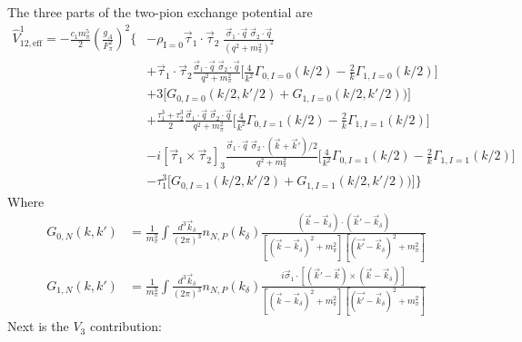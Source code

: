 \documentclass[%
 preprint,
 amsmath,amssymb,
 aps,
]{revtex4-1}
\newcommand{\veff}{\hat{V}_{12,\text{eff}}}
\newcommand{\rhozero}{\rho_{\text{I}=0}}
\newcommand{\taudot}{\vec{\tau}_1\cdot\vec{\tau}_2}
\newcommand{\taucrossthree}{\left[\vec{\tau}_1\times\vec{\tau}_2\right]_3}
\newcommand{\tauplusthree}{\frac{\tau_1^3+\tau_2^3}{2}}
\newcommand{\Gam}[3]{\Gamma_{#1, I=#2}\left(#3\right)}
\begin{document}
The three parts of the two-pion exchange potential are 
\begin{equation}\begin{split}
 \veff^1 = - \frac{c_1 m_\pi^5}{2} \left(\frac{g_A}{F_\pi^2}\right)^2
 \Bigg\{& -\rhozero \taudot \; \frac{\vec{\sigma}_1\cdot\vec{q}\;\vec{\sigma}_2\cdot\vec{q}}{(q^2+m_\pi^2)^2} \\
 &+ \taudot \frac{\vec{\sigma}_1 \cdot \vec{q}\; \vec{\sigma}_2\cdot \vec{q}}{q^2+m_\pi^2}\Big[\frac{4}{k^2}\Gam{0}{0}{k/2}-\frac{2}{k}\Gam{1}{0}{k/2}\Big] \\
 & +3 \Big[ G_{0,I=0}(k/2,k'/2)+G_{1,I=0}(k/2,k'/2)) \Big] \\
 &+\tauplusthree \frac{\vec{\sigma}_1 \cdot \vec{q}\; \vec{\sigma}_2\cdot \vec{q}}{q^2+m_\pi^2}\Big[\frac{4}{k^2}\Gam{0}{1}{k/2}-\frac{2}{k}\Gam{1}{1}{k/2}\Big] \\
 &- i \taucrossthree  \frac{\vec{\sigma}_1 \cdot \vec{q}\; \vec{\sigma}_2\cdot (\vec{k}+\vec{k}')/2}{q^2+m_\pi^2}\Big[\frac{4}{k^2}\Gam{0}{1}{k/2}-\frac{2}{k}\Gam{1}{1}{k/2}\Big]  \\
 & -\tau_1^3 \Big[ G_{0,I=1}(k/2,k'/2)+G_{1,I=1}(k/2,k'/2)) \Big] \Bigg\}
 \end{split}
 \end{equation}
Where
\begin{align}
G_{0,N}(k,k') & = \frac{1}{m_\pi^3}\int\frac{d^3\vec{k}_\delta}{(2\pi)^3} n_{N,P}(k_\delta) \frac{(\vec{k}-\vec{k}_\delta)\cdot(\vec{k}'-\vec{k}_\delta) }{[(\vec{k}-\vec{k}_\delta)^2+m_\pi^2][(\vec{k'}-\vec{k}_\delta)^2+m_\pi^2]} \\
%
G_{1,N}(k,k') & = \frac{1}{m_\pi^3}\int\frac{d^3\vec{k}_\delta}{(2\pi)^3} n_{N,P}(k_\delta) \frac{i\vec{\sigma}_1\cdot\left[(\vec{k}'-\vec{k})\times(\vec{k}-\vec{k}_\delta)\right] }{[(\vec{k}-\vec{k}_\delta)^2+m_\pi^2][(\vec{k'}-\vec{k}_\delta)^2+m_\pi^2]}
\end{align}
Next is the $V_3$ contribution:
\end{document}
